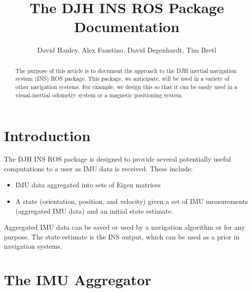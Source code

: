 \documentclass[11pt,a4paper]{article}
\title{The DJH INS ROS Package Documentation}
\author{David Hanley, Alex Faustino, David Degenhardt, Tim Bretl}
\begin{document}
\maketitle

\begin{abstract}
	The purpose of this article is to document the approach to the DJH inertial navigation system (INS) ROS package. This package, we anticipate, will be used in a variety of other navigation systems. For example, we design this so that it can be easily used in a visual-inertial odometry system or a magnetic positioning system.
\end{abstract}

\section{Introduction}

The DJH INS ROS package is designed to provide several potentially useful computations to a user as IMU data is received. These include:
\begin{itemize}
	\item IMU data aggregated into sets of Eigen matrices
	\item A state (orientation, position, and velocity) given a set of IMU measurements (aggregated IMU data) and an initial state estimate.
\end{itemize}
Aggregated IMU data can be saved or used by a navigation algorithm or for any purpose. The state estimate is the INS output, which can be used as a prior in navigation systems.

\section{The IMU Aggregator}
\end{document}
